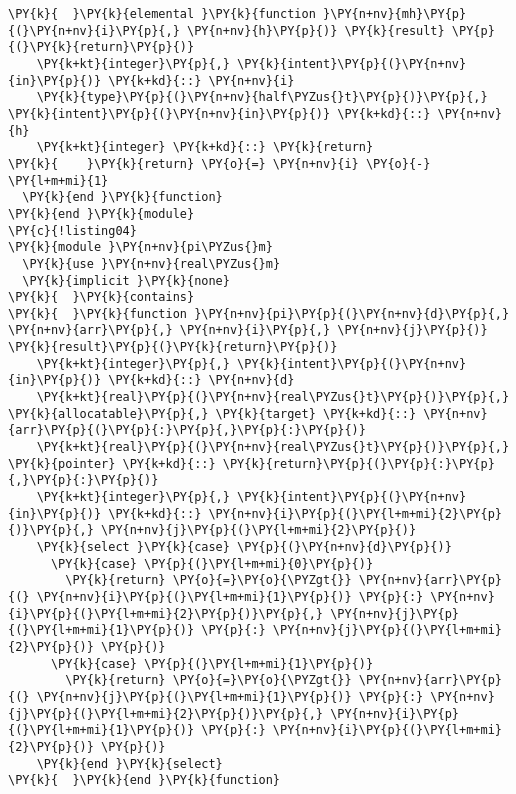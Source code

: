 \begin{Verbatim}[commandchars=\\\{\}]
\PY{k}{  }\PY{k}{elemental }\PY{k}{function }\PY{n+nv}{mh}\PY{p}{(}\PY{n+nv}{i}\PY{p}{,} \PY{n+nv}{h}\PY{p}{)} \PY{k}{result} \PY{p}{(}\PY{k}{return}\PY{p}{)}
    \PY{k+kt}{integer}\PY{p}{,} \PY{k}{intent}\PY{p}{(}\PY{n+nv}{in}\PY{p}{)} \PY{k+kd}{::} \PY{n+nv}{i} 
    \PY{k}{type}\PY{p}{(}\PY{n+nv}{half\PYZus{}t}\PY{p}{)}\PY{p}{,} \PY{k}{intent}\PY{p}{(}\PY{n+nv}{in}\PY{p}{)} \PY{k+kd}{::} \PY{n+nv}{h}
    \PY{k+kt}{integer} \PY{k+kd}{::} \PY{k}{return}
\PY{k}{    }\PY{k}{return} \PY{o}{=} \PY{n+nv}{i} \PY{o}{-} \PY{l+m+mi}{1}
  \PY{k}{end }\PY{k}{function}
\PY{k}{end }\PY{k}{module}
\PY{c}{!listing04}
\PY{k}{module }\PY{n+nv}{pi\PYZus{}m}
  \PY{k}{use }\PY{n+nv}{real\PYZus{}m}
  \PY{k}{implicit }\PY{k}{none}
\PY{k}{  }\PY{k}{contains}
\PY{k}{  }\PY{k}{function }\PY{n+nv}{pi}\PY{p}{(}\PY{n+nv}{d}\PY{p}{,} \PY{n+nv}{arr}\PY{p}{,} \PY{n+nv}{i}\PY{p}{,} \PY{n+nv}{j}\PY{p}{)} \PY{k}{result}\PY{p}{(}\PY{k}{return}\PY{p}{)}
    \PY{k+kt}{integer}\PY{p}{,} \PY{k}{intent}\PY{p}{(}\PY{n+nv}{in}\PY{p}{)} \PY{k+kd}{::} \PY{n+nv}{d}
    \PY{k+kt}{real}\PY{p}{(}\PY{n+nv}{real\PYZus{}t}\PY{p}{)}\PY{p}{,} \PY{k}{allocatable}\PY{p}{,} \PY{k}{target} \PY{k+kd}{::} \PY{n+nv}{arr}\PY{p}{(}\PY{p}{:}\PY{p}{,}\PY{p}{:}\PY{p}{)}
    \PY{k+kt}{real}\PY{p}{(}\PY{n+nv}{real\PYZus{}t}\PY{p}{)}\PY{p}{,} \PY{k}{pointer} \PY{k+kd}{::} \PY{k}{return}\PY{p}{(}\PY{p}{:}\PY{p}{,}\PY{p}{:}\PY{p}{)}
    \PY{k+kt}{integer}\PY{p}{,} \PY{k}{intent}\PY{p}{(}\PY{n+nv}{in}\PY{p}{)} \PY{k+kd}{::} \PY{n+nv}{i}\PY{p}{(}\PY{l+m+mi}{2}\PY{p}{)}\PY{p}{,} \PY{n+nv}{j}\PY{p}{(}\PY{l+m+mi}{2}\PY{p}{)}
    \PY{k}{select }\PY{k}{case} \PY{p}{(}\PY{n+nv}{d}\PY{p}{)} 
      \PY{k}{case} \PY{p}{(}\PY{l+m+mi}{0}\PY{p}{)} 
        \PY{k}{return} \PY{o}{=}\PY{o}{\PYZgt{}} \PY{n+nv}{arr}\PY{p}{(} \PY{n+nv}{i}\PY{p}{(}\PY{l+m+mi}{1}\PY{p}{)} \PY{p}{:} \PY{n+nv}{i}\PY{p}{(}\PY{l+m+mi}{2}\PY{p}{)}\PY{p}{,} \PY{n+nv}{j}\PY{p}{(}\PY{l+m+mi}{1}\PY{p}{)} \PY{p}{:} \PY{n+nv}{j}\PY{p}{(}\PY{l+m+mi}{2}\PY{p}{)} \PY{p}{)}   
      \PY{k}{case} \PY{p}{(}\PY{l+m+mi}{1}\PY{p}{)} 
        \PY{k}{return} \PY{o}{=}\PY{o}{\PYZgt{}} \PY{n+nv}{arr}\PY{p}{(} \PY{n+nv}{j}\PY{p}{(}\PY{l+m+mi}{1}\PY{p}{)} \PY{p}{:} \PY{n+nv}{j}\PY{p}{(}\PY{l+m+mi}{2}\PY{p}{)}\PY{p}{,} \PY{n+nv}{i}\PY{p}{(}\PY{l+m+mi}{1}\PY{p}{)} \PY{p}{:} \PY{n+nv}{i}\PY{p}{(}\PY{l+m+mi}{2}\PY{p}{)} \PY{p}{)}   
    \PY{k}{end }\PY{k}{select}
\PY{k}{  }\PY{k}{end }\PY{k}{function}


\end{Verbatim}
